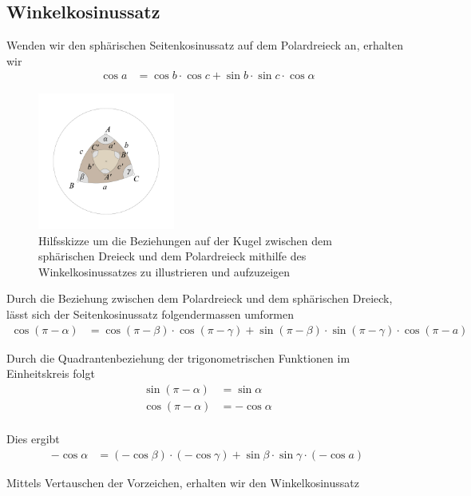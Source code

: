 \begin{refsection}
\subsection{Winkelkosinussatz}

Wenden wir den sphärischen Seitenkosinussatz auf dem Polardreieck an, erhalten wir
\begin{align*}
{\cos a} &= {\cos b} \cdot {\cos c} + {\sin b} \cdot {\sin c} \cdot {\cos \alpha}
\end{align*}

\begin{figure}[htbp]
\centering
\includegraphics[width=0.4\textwidth]{kugel/PolarWinkelkosinus.jpg}
\caption{Hilfsskizze um die Beziehungen auf der Kugel zwischen dem sphärischen Dreieck und dem Polardreieck mithilfe des Winkelkosinussatzes zu illustrieren und aufzuzeigen}
\end{figure}

Durch die Beziehung zwischen dem Polardreieck und dem sphärischen Dreieck, lässt sich der Seitenkosinussatz folgendermassen umformen
\begin{align*}
{\cos (\pi-\alpha)} &= {\cos (\pi-\beta)} \cdot {\cos (\pi-\gamma)} + {\sin(\pi-\beta)} \cdot {\sin(\pi-\gamma)} \cdot {\cos (\pi-a)}
\end{align*}

Durch die Quadrantenbeziehung der trigonometrischen Funktionen im Einheitskreis folgt
\begin{align*}
\sin (\pi-\alpha) &= \sin \alpha\\
\cos (\pi-\alpha) &= - \cos \alpha\\
\end{align*}

Dies ergibt
\begin{align*}
{-\cos \alpha} &= {(-\cos \beta)} \cdot {(-\cos \gamma)} + {\sin \beta} \cdot {\sin \gamma} \cdot {(-\cos a)}
\end{align*}

Mittels Vertauschen der Vorzeichen, erhalten wir den Winkelkosinussatz


\end{refsection}
